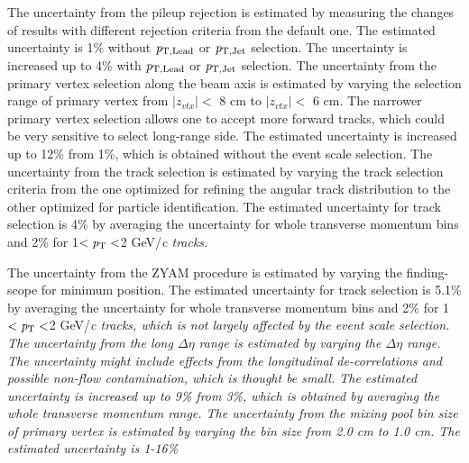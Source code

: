 The uncertainty from the pileup rejection is estimated by measuring the changes of results with different rejection criteria from the default one. The estimated uncertainty is 1\% without $\it{p}_{\rm{T, Lead}}$ or $\it{p}_{\rm{T, Jet}}$ selection. The uncertainty is increased up to 4\% with $\it{p}_{\rm{T, Lead}}$ or $\it{p}_{\rm{T, Jet}}$ selection. The uncertainty from the primary vertex selection along the beam axis is estimated by varying the selection range of primary vertex from $|z_{vtx}|<$ 8 cm to $|z_{vtx}|<$ 6 cm. The narrower primary vertex selection allows one to accept more forward tracks, which could be very sensitive to select long-range side. The estimated uncertainty is increased up to 12\% from 1\%, which is obtained without the event scale selection. The uncertainty from the track selection is estimated by varying the track selection criteria from the one optimized for refining the angular track distribution to the other optimized for particle identification. The estimated uncertainty for track selection is 4\% by averaging the uncertainty for whole transverse momentum bins and 2\% for 1$<\it{p}_{\rm{T}}<$2 GeV/\it{c}\rm{} tracks.

The uncertainty from the ZYAM procedure is estimated by varying the finding-scope for minimum position. The estimated uncertainty for track selection is 5.1\% by averaging the uncertainty for whole transverse momentum bins and 2\% for 1$<\it{p}_{\rm{T}}<$2 GeV/\it{c}\rm{} tracks, which is not largely affected by the event scale selection. The uncertainty from the long $\Delta\eta$ range is estimated by varying the $\Delta\eta$ range. The uncertainty might include effects from the longitudinal de-correlations and possible non-flow contamination, which is thought be small. The estimated uncertainty is increased up to 9\% from 3\%, which is obtained by averaging the whole transverse momentum range.
The uncertainty from the mixing pool bin size of primary vertex is estimated by varying the bin size from 2.0 cm to 1.0 cm. The estimated uncertainty is 1-16\%




\iffalse



